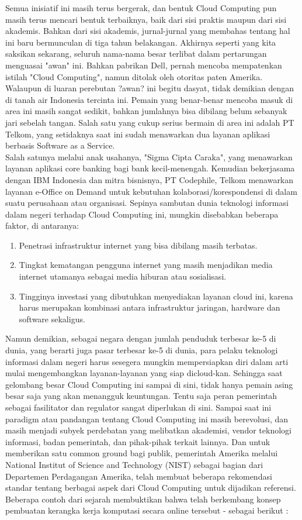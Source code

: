\tab Semua inisiatif ini masih terus bergerak, dan bentuk Cloud Computing pun masih terus mencari bentuk terbaiknya, baik dari sisi praktis maupun dari sisi akademis. Bahkan dari sisi akademis, jurnal-jurnal yang membahas tentang hal ini baru bermunculan di tiga tahun belakangan. Akhirnya seperti yang kita saksikan sekarang, seluruh nama-nama besar terlibat dalam pertarungan menguasai "awan" ini. Bahkan pabrikan Dell, pernah mencoba mempatenkan istilah "Cloud Computing", namun ditolak oleh otoritas paten Amerika. Walaupun di luaran perebutan ?awan? ini begitu dasyat, tidak demikian dengan di tanah air Indonesia tercinta ini. Pemain yang benar-benar mencoba masuk di area ini masih sangat sedikit, bahkan jumlahnya bisa dibilang belum sebanyak jari sebelah tangan. Salah satu yang cukup serius bermain di area ini adalah PT Telkom, yang setidaknya saat ini sudah menawarkan dua layanan aplikasi berbasis Software as a Service. \\Salah satunya melalui anak usahanya, "Sigma Cipta Caraka", yang menawarkan layanan aplikasi core banking bagi bank kecil-menengah. Kemudian bekerjasama dengan IBM Indonesia dan mitra bisnisnya, PT Codephile, Telkom menawarkan layanan e-Office on Demand untuk kebutuhan kolaborasi/korespondensi di dalam suatu perusahaan atau organisasi. Sepinya sambutan dunia teknologi informasi dalam negeri terhadap Cloud Computing ini, mungkin disebabkan beberapa faktor, di antaranya:
\begin{enumerate}
\item Penetrasi infrastruktur internet yang bisa dibilang masih terbatas.
\item Tingkat kematangan pengguna internet yang masih menjadikan media internet utamanya sebagai media hiburan atau sosialisasi.
\item Tingginya investasi yang dibutuhkan menyediakan layanan cloud ini, karena harus merupakan kombinasi antara infrastruktur jaringan, hardware dan software sekaligus.
\end{enumerate}
\tab Namun demikian, sebagai negara dengan jumlah penduduk terbesar ke-5 di dunia, yang berarti juga pasar terbesar ke-5 di dunia, para pelaku teknologi informasi dalam negeri harus sesegera mungkin mempersiapkan diri dalam arti mulai mengembangkan layanan-layanan yang siap dicloud-kan. Sehingga saat gelombang besar Cloud Computing ini sampai di sini, tidak hanya pemain asing besar saja yang akan menangguk keuntungan. Tentu saja peran pemerintah sebagai fasilitator dan regulator sangat diperlukan di sini. Sampai saat ini paradigm atau pandangan tentang Cloud Computing ini masih berevolusi, dan masih menjadi subyek perdebatan yang melibatkan akademisi, vendor teknologi informasi, badan pemerintah, dan pihak-pihak terkait lainnya. Dan untuk memberikan satu common ground bagi publik, pemerintah Amerika melalui National Institut of Science and Technology (NIST) sebagai bagian dari Departemen Perdagangan Amerika, telah membuat beberapa rekomendasi standar tentang berbagai aspek dari Cloud Computing untuk dijadikan referensi. Beberapa contoh dari sejarah membuktikan bahwa telah berkembang konsep pembuatan kerangka kerja komputasi secara online tersebut - sebagai berikut :
